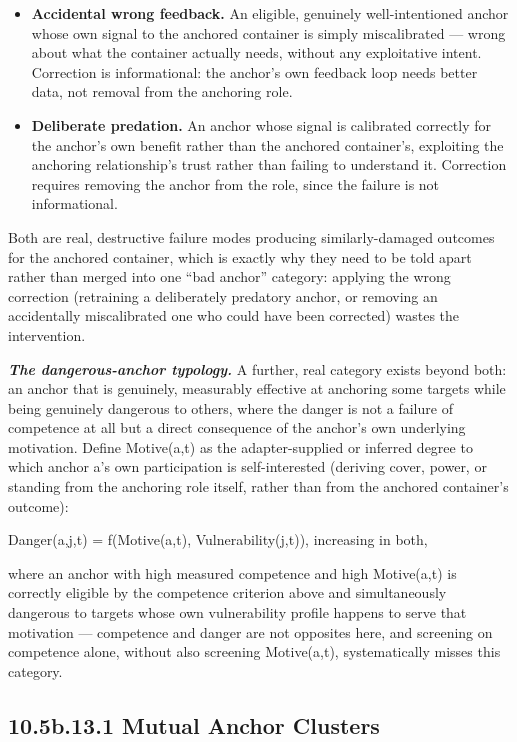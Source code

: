 \documentclass[
]{article}
\begin{document}
\begin{itemize}
\item
  \textbf{Accidental wrong feedback.} An eligible, genuinely
  well-intentioned anchor whose own signal to the anchored container is
  simply miscalibrated --- wrong about what the container actually
  needs, without any exploitative intent. Correction is informational:
  the anchor's own feedback loop needs better data, not removal from the
  anchoring role.
\item
  \textbf{Deliberate predation.} An anchor whose signal is calibrated
  correctly for the anchor's own benefit rather than the anchored
  container's, exploiting the anchoring relationship's trust rather than
  failing to understand it. Correction requires removing the anchor from
  the role, since the failure is not informational.
\end{itemize}

Both are real, destructive failure modes producing similarly-damaged
outcomes for the anchored container, which is exactly why they need to
be told apart rather than merged into one ``bad anchor'' category:
applying the wrong correction (retraining a deliberately predatory
anchor, or removing an accidentally miscalibrated one who could have
been corrected) wastes the intervention.

\emph{\textbf{The dangerous-anchor typology.}} A further, real category
exists beyond both: an anchor that is genuinely, measurably effective at
anchoring some targets while being genuinely dangerous to others, where
the danger is not a failure of competence at all but a direct
consequence of the anchor's own underlying motivation. Define
Motive(a,t) as the adapter-supplied or inferred degree to which anchor
a's own participation is self-interested (deriving cover, power, or
standing from the anchoring role itself, rather than from the anchored
container's outcome):

Danger(a,j,t) = f(Motive(a,t), Vulnerability(j,t)), increasing in both,

where an anchor with high measured competence and high Motive(a,t) is
correctly eligible by the competence criterion above and simultaneously
dangerous to targets whose own vulnerability profile happens to serve
that motivation --- competence and danger are not opposites here, and
screening on competence alone, without also screening Motive(a,t),
systematically misses this category.

\hypertarget{b.13.1-mutual-anchor-clusters}{%
\subsection{10.5b.13.1 Mutual Anchor
Clusters}\label{b.13.1-mutual-anchor-clusters}}
\end{document}
